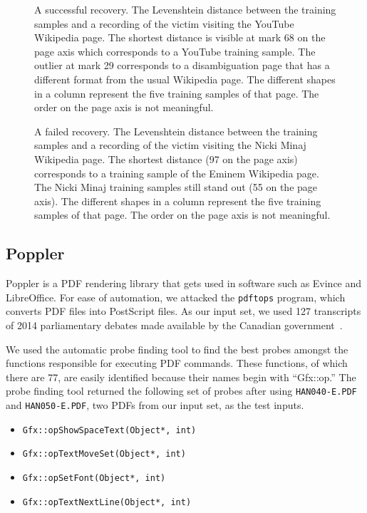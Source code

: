 \documentclass[letterpaper,twocolumn,10pt]{article}
\begin{document}
\begin{figure*}
    \centering
    
    \caption{A successful recovery. The Levenshtein distance between the
    training samples and a recording of the victim visiting the YouTube
    Wikipedia page. The shortest distance is visible at mark 68 on the page axis
    which corresponds to a YouTube training sample. The outlier at mark 29
    corresponds to a disambiguation page that has a different format from the
usual Wikipedia page. The different shapes in a column represent the five
training samples of that page. The order on the page axis is not meaningful.}
    \label{figure:youtube}
\end{figure*}

\begin{figure*}
    \centering
    
    \caption{A failed recovery. The Levenshtein distance between the training samples and
        a recording of the victim visiting the Nicki Minaj Wikipedia page. The
        shortest distance (97 on the page axis) corresponds to a training sample
        of the Eminem Wikipedia page. The Nicki Minaj training samples still
        stand out (55 on the page axis). The different shapes in a column
        represent the five training samples of that page. The order on the page
        axis is not meaningful.}
    \label{figure:minaj}
\end{figure*}

\subsection{Poppler}

Poppler is a PDF rendering library that gets used in software such as Evince and
LibreOffice. For ease of automation, we attacked the \texttt{pdftops} program,
which converts PDF files into PostScript files. As our input set, we used 127
transcripts of 2014 parliamentary debates made available by the Canadian
government~\cite{hansard}.

We used the automatic probe finding tool to find the best probes amongst the
functions responsible for executing PDF commands. These functions, of which
there are 77, are easily identified because their names begin with ``Gfx::op.''
The probe finding tool returned the following set of probes after using
\texttt{HAN040-E.PDF} and \texttt{HAN050-E.PDF}, two PDFs from our input set, as
the test inputs.

\begin{itemize}
    \item \texttt{Gfx::opShowSpaceText(Object*, int)}
    \item \texttt{Gfx::opTextMoveSet(Object*, int)}
    \item \texttt{Gfx::opSetFont(Object*, int)}
    \item \texttt{Gfx::opTextNextLine(Object*, int)}
\end{itemize}
\end{document}
